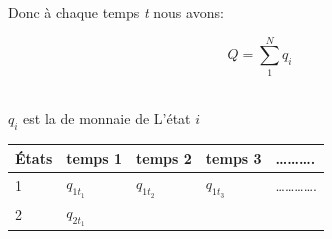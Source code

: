 \documentclass[11pt,]{article}
\begin{document}
Donc à chaque temps \emph{t} nous avons:

\[Q=\sum_1^N q_{i}\]\\

\begin{flushright}
$q_{i}$ est la  de monnaie de L'état $i$ 
\end{flushright}

\begin{longtable}[]{@{}lllll@{}}
\toprule
\begin{minipage}[b]{0.08\columnwidth}\raggedright\strut
États\strut
\end{minipage} & \begin{minipage}[b]{0.11\columnwidth}\raggedright\strut
temps 1\strut
\end{minipage} & \begin{minipage}[b]{0.11\columnwidth}\raggedright\strut
temps 2\strut
\end{minipage} & \begin{minipage}[b]{0.10\columnwidth}\raggedright\strut
temps 3\strut
\end{minipage} & \begin{minipage}[b]{0.44\columnwidth}\raggedright\strut
\ldots{}\ldots{}\ldots{}.\strut
\end{minipage}\tabularnewline
\midrule
\endhead
\begin{minipage}[t]{0.08\columnwidth}\raggedright\strut
1\strut
\end{minipage} & \begin{minipage}[t]{0.11\columnwidth}\raggedright\strut
\(q_{1t_1}\)\strut
\end{minipage} & \begin{minipage}[t]{0.11\columnwidth}\raggedright\strut
\(q_{1t_2}\)\strut
\end{minipage} & \begin{minipage}[t]{0.10\columnwidth}\raggedright\strut
\(q_{1t_3}\)\strut
\end{minipage} & \begin{minipage}[t]{0.44\columnwidth}\raggedright\strut
\ldots{}\ldots{}\ldots{}\ldots{}.\strut
\end{minipage}\tabularnewline
\begin{minipage}[t]{0.08\columnwidth}\raggedright\strut
2\strut
\end{minipage} & \begin{minipage}[t]{0.11\columnwidth}\raggedright\strut
\(q_{2t_1}\)\strut
\end{minipage} & \begin{minipage}[t]{0.11\columnwidth}\raggedright\strut

\end{minipage}
\end{longtable}
\end{document}
